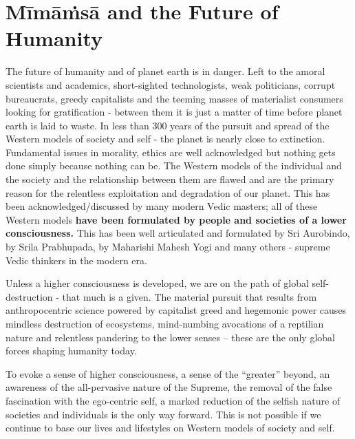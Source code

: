 \vspace{-.3cm}

\section*{Mīmāṁsā and the Future of Humanity}

The future of humanity and of planet earth is in danger. Left to the amoral scientists and academics, short-sighted technologists, weak politicians, corrupt bureaucrats, greedy capitalists and the teeming masses of materialist consumers looking for gratification - between them it is just a matter of time before planet earth is laid to waste. In less than 300 years of the pursuit and spread of the Western models of society and self - the planet is nearly close to extinction. Fundamental issues in morality, ethics are well acknowledged but nothing gets done simply because nothing can be. The Western models of the individual and the society and the relationship between them are flawed and are the primary reason for the relentless exploitation and degradation of our planet. This has been acknowledged/discussed by many modern Vedic masters; all of these Western models \textbf{have been formulated by people and societies of a lower consciousness.} This has been well articulated and formulated by Sri Aurobindo, by Srila Prabhupada, by Maharishi Mahesh Yogi and many others - supreme Vedic thinkers in the modern era.

Unless a higher consciousness is developed, we are on the path of global self-destruction - that much is a given. The material pursuit that results from anthropocentric science powered by capitalist greed and hegemonic power causes mindless destruction of ecosystems, mind-numbing avocations of a reptilian nature and relentless pandering to the lower senses – these are the only global forces shaping humanity today.

To evoke a sense of higher consciousness, a sense of the “greater” beyond, an awareness of the all-pervasive nature of the Supreme, the removal of the false fascination with the ego-centric self, a marked reduction of the selfish nature of societies and individuals is the only way forward. This is not possible if we continue to base our lives and lifestyles on Western models of society and self.

